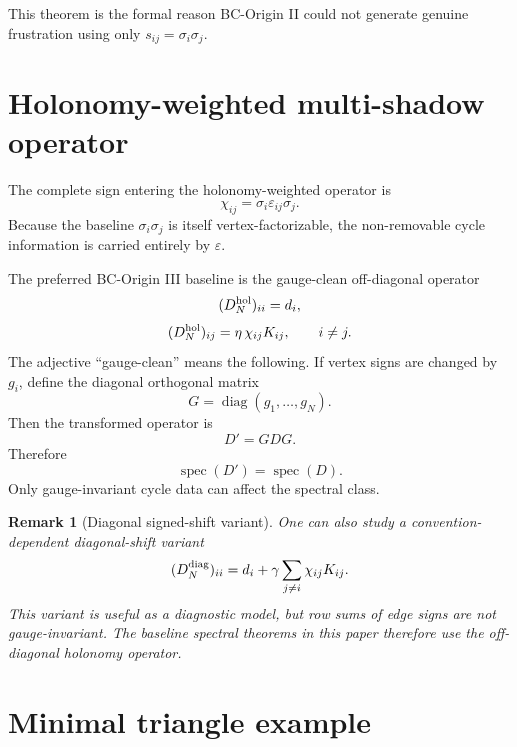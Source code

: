 \documentclass[11pt]{article}
\newtheorem{remark}{Remark}
\newcommand{\spec}{\operatorname{spec}}
\newcommand{\diag}{\operatorname{diag}}
\begin{document}
This theorem is the formal reason BC-Origin II could not generate genuine frustration using only $s_{ij}=\sigma_i\sigma_j$.

\section{Holonomy-weighted multi-shadow operator}

The complete sign entering the holonomy-weighted operator is
\begin{equation}
 \chi_{ij}=\sigma_i\varepsilon_{ij}\sigma_j.
\end{equation}
Because the baseline $\sigma_i\sigma_j$ is itself vertex-factorizable, the non-removable cycle information is carried entirely by $\varepsilon$.

The preferred BC-Origin III baseline is the gauge-clean off-diagonal operator
\begin{equation}
 (D^{\rm hol}_N)_{ii}=d_i,
\end{equation}
\begin{equation}
 (D^{\rm hol}_N)_{ij}=\eta\,\chi_{ij}K_{ij},\qquad i\ne j.
\end{equation}
The adjective ``gauge-clean'' means the following. If vertex signs are changed by $g_i$, define the diagonal orthogonal matrix
\begin{equation}
 G=\diag(g_1,\ldots,g_N).
\end{equation}
Then the transformed operator is
\begin{equation}
 D' = G D G.
\end{equation}
Therefore
\begin{equation}
 \spec(D')=\spec(D).
\end{equation}
Only gauge-invariant cycle data can affect the spectral class.

\begin{remark}[Diagonal signed-shift variant]
One can also study a convention-dependent diagonal-shift variant
\begin{equation}
 (D^{\rm diag}_N)_{ii}=d_i+\gamma\sum_{j\ne i}\chi_{ij}K_{ij}.
\end{equation}
This variant is useful as a diagnostic model, but row sums of edge signs are not gauge-invariant. The baseline spectral theorems in this paper therefore use the off-diagonal holonomy operator.
\end{remark}

\section{Minimal triangle example}
\end{document}
